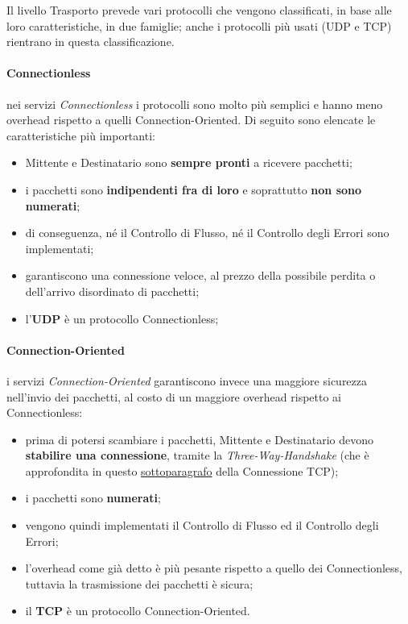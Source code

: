 \documentclass[a4paper]{article}
\begin{document}
				Il livello Trasporto prevede vari protocolli che vengono classificati, in base alle loro caratteristiche, in due famiglie; anche i protocolli più usati (UDP e TCP) rientrano in questa classificazione.
					
				\paragraph{Connectionless}
					nei servizi \emph{Connectionless} i protocolli sono molto più semplici e hanno meno overhead rispetto a quelli Connection-Oriented. Di seguito sono elencate le caratteristiche più importanti:
					\begin{itemize}
						\item Mittente e Destinatario sono \textbf{sempre pronti} a ricevere pacchetti;
						\item i pacchetti sono \textbf{indipendenti fra di loro} e soprattutto \textbf{non sono numerati};
						\item di conseguenza, né il Controllo di Flusso, né il Controllo degli Errori sono implementati;
						\item garantiscono una connessione veloce, al prezzo della possibile perdita o dell'arrivo disordinato di pacchetti;
						\item l'\textbf{UDP} è un protocollo Connectionless;
					\end{itemize}
						
				\paragraph{Connection-Oriented}
					i servizi \emph{Connection-Oriented} garantiscono invece una maggiore sicurezza nell'invio dei pacchetti, al costo di un maggiore overhead rispetto ai Connectionless:
					\begin{itemize}
						\item prima di potersi scambiare i pacchetti, Mittente e Destinatario devono \textbf{stabilire una connessione}, tramite la \emph{Three-Way-Handshake} (che è approfondita in questo \hyperref[par:apertura]{sottoparagrafo} della Connessione TCP);
						\item i pacchetti sono \textbf{numerati};
						\item vengono quindi implementati il Controllo di Flusso ed il Controllo degli Errori;
						\item l'overhead come già detto è più pesante rispetto a quello dei Connectionless, tuttavia la trasmissione dei pacchetti è sicura;
						\item il \textbf{TCP} è un protocollo Connection-Oriented.
					\end{itemize}
						
\end{document}
